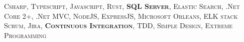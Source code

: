 
{\fontsize{8pt}{1em}\bodyfont\scshape\color{graytext}
 Csharp, Typescript, Javascript, Rust, \textbf{SQL Server}, Elastic Search, .Net Core 2+, .Net MVC, NodeJS, ExpressJS, Microsoft Orleans, ELK stack Scrum, Jira, \textbf{Continuous Integration}, TDD, Simple Design, Extreme Programming
}

